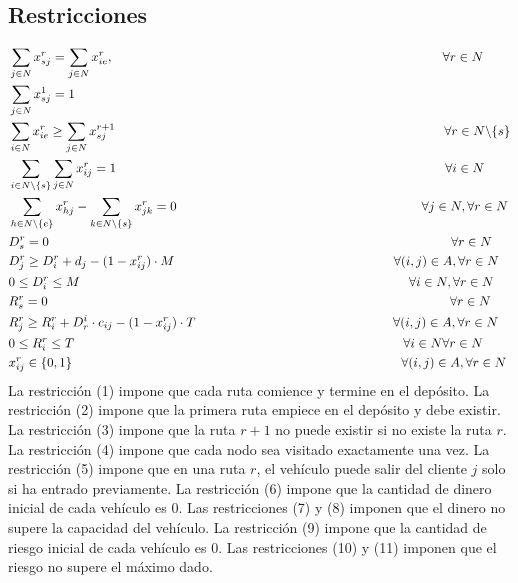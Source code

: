 \documentclass[letter, 10pt]{article}
\begin{document}
\subsection{Restricciones}
\begin{align}
    & \sum_{j\in N} x^r_{sj} = \sum_{j\in N} x^r_{ie}, \hspace{9cm} \forall r\in N\\
    &\sum_{j \in N}x_{sj}^1 = 1\\
    &\sum_{i \in N}x_{ie}^r \geq \sum_{j \in N}x_{sj}^{r + 1} \hspace{9cm} \forall r\in N \backslash \{s\}\\
    &\sum_{i \in N \backslash \{s\}}\sum_{j \in N}x_{ij}^r = 1 \hspace{9cm} \forall i\in N \\
    &\sum_{h \in N \backslash \{e\}}x_{hj}^r - \sum_{k \in N \backslash \{s\}}x_{jk}^r = 0 \hspace{6.7cm} \forall j\in N, \forall r \in N\\
    &D^r_s = 0 \hspace{11cm} \forall r\in N\\
    & D^r_j \geq D^r_i + d_j - (1 - x^r_{ij}) \cdot M \hspace{6cm} \forall (i,j) \in A, \forall r \in N\\
    & 0 \leq D_i^r \leq M \hspace{9cm} \forall i\in N, \forall r\in N\\
    & R^r_s = 0 \hspace{11cm} \forall r \in N\\
    & R^r_j \geq R^r_i + D_r^i \cdot c_{ij} - (1 - x^r_{ij}) \cdot T \hspace{5.4cm} \forall (i,j) \in A, \forall r \in N\\
    &0 \leq R_i^r \leq T \hspace{9cm} \forall i \in N \forall r \in N \\
    &x_{ij} ^r \in \{0,1\}\hspace{9cm} \forall (i,j) \in A, \forall r \in N
\end{align}
 La restricción (1) impone que cada ruta comience y termine en el depósito. La restricción (2) impone que la primera ruta empiece en el depósito y debe existir. La restricción (3) impone que la ruta $r+1$ no puede existir si no existe la ruta $r$. La restricción (4) impone que cada nodo sea visitado exactamente una vez. La restricción (5) impone que en una ruta $r$, el vehículo puede salir del cliente $j$ solo si ha entrado previamente. La restricción (6) impone que la cantidad de dinero inicial de cada vehículo es 0. Las restricciones (7) y (8) imponen que el dinero no supere la capacidad del vehículo. 
 La restricción (9) impone que la cantidad de riesgo inicial de cada vehículo es 0. Las restricciones (10) y (11) imponen que el riesgo no supere el máximo dado. 
\end{document}
